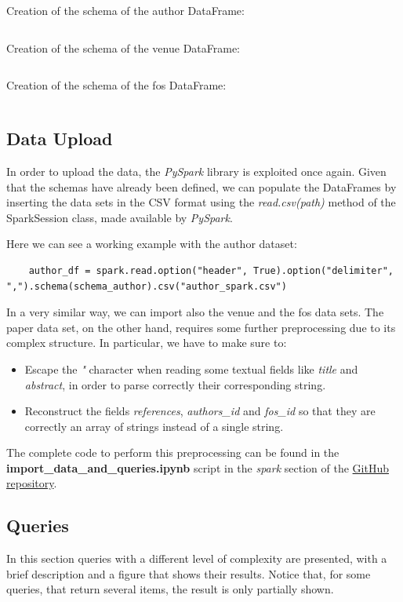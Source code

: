 \documentclass{Configuration_Files/PoliMi3i_thesis}
\begin{document}
Creation of the schema of the author DataFrame:
 \inputminted[linenos,tabsize=2,breaklines]{Python}{code/code_spark/author_schema.txt}

Creation of the schema of the venue DataFrame:
 \inputminted[linenos,tabsize=2,breaklines]{Python}{code/code_spark/venue_schema.txt}

Creation of the schema of the fos DataFrame:
 \inputminted[linenos,tabsize=2,breaklines]{Python}{code/code_spark/fos_schema.txt}

\subsection{Data Upload}
In order to upload the data, the \textit{PySpark} library is exploited once again.
Given that the schemas have already been defined, we can populate the DataFrames by inserting the data sets in the CSV format using the \textit{read.csv(path)} method of the SparkSession class, made available by \textit{PySpark}.

Here we can see a working example with the author dataset:
\begin{verbatim}
	author_df = spark.read.option("header", True).option("delimiter", ",").schema(schema_author).csv("author_spark.csv")
\end{verbatim}

In a very similar way, we can import also the venue and the fos data sets. The paper data set, on the other hand, requires some further preprocessing due to its complex structure. In particular, we have to make sure to:

\begin{itemize}
    \item Escape the \textit{"} character when reading some textual fields like \textit{title} and \textit{abstract}, in order to parse correctly their corresponding string.
    \item Reconstruct the fields \textit{references}, \textit{authors\_id} and \textit{fos\_id} so that they are correctly an array of strings instead of a single string.
\end{itemize}

The complete code to perform this preprocessing can be found in the \\\textbf{import\_data\_and\_queries.ipynb} script in the \textit{spark} section of the \href{https://github.com/albertopirillo/smbud-project-2022}{GitHub repository}.

\pagebreak
\subsection{Queries}
In this section queries with a different level of complexity are presented, with a brief description and a figure that shows their results. Notice that, for some queries, that return several items, the result is only partially shown.
\end{document}
